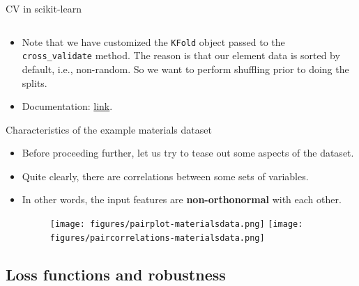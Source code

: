 \documentclass[aspectratio=169]{beamer}
\begin{document}
\begin{frame}[fragile]{CV in scikit-learn}
\inputminted{python}{example_sklearn_cv.py}
\begin{itemize}
    \item Note that we have customized the \texttt{KFold} object passed to the \texttt{cross\_validate} method. The reason is that our element data is sorted by default, i.e., non-random. So we want to perform shuffling prior to doing the splits.
    \item Documentation: \href{https://scikit-learn.org/stable/modules/generated/sklearn.model_selection.cross_validate.html?highlight=cross_validate#sklearn.model_selection.cross_validate}{link}.
\end{itemize}
\end{frame}


\begin{frame}{Characteristics of the example materials dataset}
    \begin{itemize}
        \item Before proceeding further, let us try to tease out some aspects of the dataset.
        \item Quite clearly, there are correlations between some sets of variables.
        \item In other words, the input features are \textbf{non-orthonormal} with each other.
        \begin{figure}
            \centering
            \texttt{[image: figures/pairplot-materialsdata.png]}
            \texttt{[image: figures/paircorrelations-materialsdata.png]}
        \end{figure}
    \end{itemize}
\end{frame}


\subsection{Loss functions and robustness}
\end{document}
